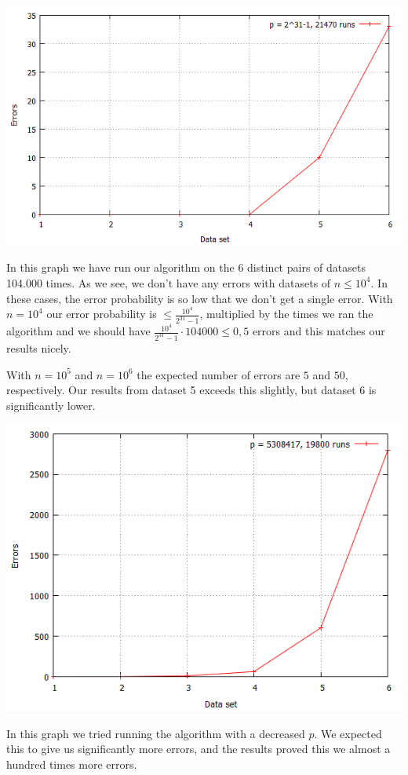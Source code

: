 \documentclass[article,a4paper,oneside]{article}
\newcommand{\+}[1]{\ensuremath{\boldsymbol{#1}}}
\begin{document}
\begin{center}
\includegraphics[scale=0.3]{p=2^31-1.png}\\
\end{center}
In this graph we have run our algorithm on the 6 distinct pairs of datasets 104.000 times. As we see, we don't have any errors with datasets of $n\leq 10^4$. In these cases, the error probability is so low that we don't get a single error. With $n=10^4$ our error probability is $\leq \frac{10^4}{2^{31}-1}$, multiplied by the times we ran the algorithm and we should have $\frac{10^4}{2^{31}-1}\cdot 104000 \leq 0,5$ errors and this matches our results nicely.

With $n=10^5$ and $n=10^6$ the expected number of errors are $5$ and $50$, respectively. Our results from dataset 5 exceeds this slightly, but dataset 6 is significantly lower.

\begin{center}
\includegraphics[scale=0.3]{p=5308417.png}\\
\end{center}
In this graph we tried running the algorithm with a decreased $p$. We expected this to give us significantly more errors, and the results proved this we almost a hundred times more errors.
\end{document}
